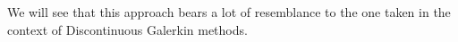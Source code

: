 We will see that this approach bears a lot of resemblance to the one taken in the context 
of Discontinuous Galerkin methods. 


























